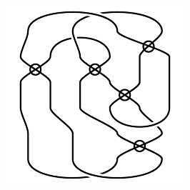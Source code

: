 \begin{figure}[H]
\begin{minipage}[b]{.18\linewidth}
\end{minipage}
\begin{minipage}[b]{.18\linewidth}
\centering
\includegraphics[width=\linewidth]{../data/virtual_4_21.png}
\end{minipage}
\end{figure}


